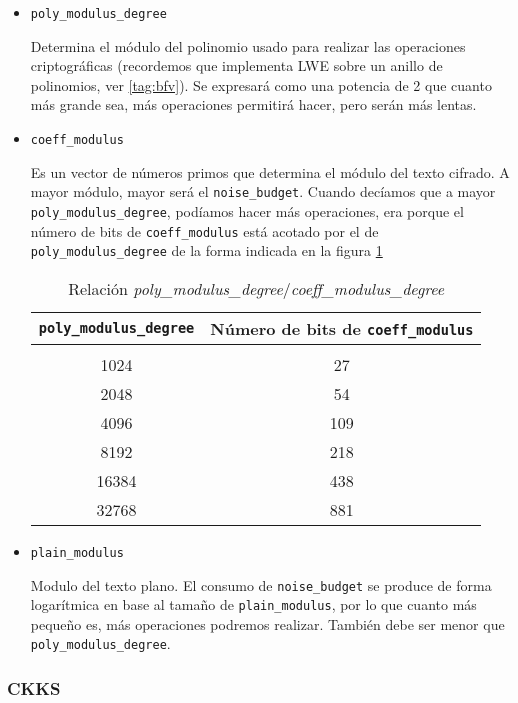 \begin{itemize}
    \item \verb|poly_modulus_degree|
    
    Determina el módulo del polinomio usado para realizar las operaciones criptográficas (recordemos que implementa LWE sobre un anillo de polinomios, ver \ref{tag:bfv}). Se expresará como una potencia de 2 que cuanto más grande sea, más operaciones permitirá hacer, pero serán más lentas.
    
    \item \verb|coeff_modulus|
    
    Es un vector de números primos que determina el módulo del texto cifrado. A mayor módulo, mayor será el \verb|noise_budget|. Cuando decíamos que a mayor \verb|poly_modulus_degree|, podíamos hacer más operaciones, era porque el número de bits de \verb|coeff_modulus| está acotado por el de \verb|poly_modulus_degree| de la forma indicada en la figura \ref{table:poly_vs_coeff_modulus}
    
    \begin{table}
        \centering
        \begin{tabular}{  c  c  }
        \verb|poly_modulus_degree|  & Número de bits de \verb|coeff_modulus| \\
        \hline \hline \\
        1024  & 27  \\
        2048  & 54  \\
        4096  & 109 \\
        8192  & 218 \\
        16384 & 438 \\
        32768 & 881
        \end{tabular}
        \caption{Relación \textit{poly\_modulus\_degree}/\textit{coeff\_modulus\_degree}}
        \label{table:poly_vs_coeff_modulus}

    \end{table}
    
    \item \verb|plain_modulus|
    
    Modulo del texto plano. El consumo de \verb|noise_budget| se produce de forma logarítmica en base al tamaño de \verb|plain_modulus|, por lo que cuanto más pequeño es, más operaciones podremos realizar. También debe ser menor que \verb|poly_modulus_degree|.
\end{itemize}{}

\subsubsection{CKKS}

